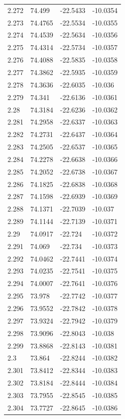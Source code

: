 \begin{tabular}{llll}
2.272 & 74.499 & -22.5433 & -10.0354 \\
2.273 & 74.4765 & -22.5534 & -10.0355 \\
2.274 & 74.4539 & -22.5634 & -10.0356 \\
2.275 & 74.4314 & -22.5734 & -10.0357 \\
2.276 & 74.4088 & -22.5835 & -10.0358 \\
2.277 & 74.3862 & -22.5935 & -10.0359 \\
2.278 & 74.3636 & -22.6035 & -10.036 \\
2.279 & 74.341 & -22.6136 & -10.0361 \\
2.28 & 74.3184 & -22.6236 & -10.0362 \\
2.281 & 74.2958 & -22.6337 & -10.0363 \\
2.282 & 74.2731 & -22.6437 & -10.0364 \\
2.283 & 74.2505 & -22.6537 & -10.0365 \\
2.284 & 74.2278 & -22.6638 & -10.0366 \\
2.285 & 74.2052 & -22.6738 & -10.0367 \\
2.286 & 74.1825 & -22.6838 & -10.0368 \\
2.287 & 74.1598 & -22.6939 & -10.0369 \\
2.288 & 74.1371 & -22.7039 & -10.037 \\
2.289 & 74.1144 & -22.7139 & -10.0371 \\
2.29 & 74.0917 & -22.724 & -10.0372 \\
2.291 & 74.069 & -22.734 & -10.0373 \\
2.292 & 74.0462 & -22.7441 & -10.0374 \\
2.293 & 74.0235 & -22.7541 & -10.0375 \\
2.294 & 74.0007 & -22.7641 & -10.0376 \\
2.295 & 73.978 & -22.7742 & -10.0377 \\
2.296 & 73.9552 & -22.7842 & -10.0378 \\
2.297 & 73.9324 & -22.7942 & -10.0379 \\
2.298 & 73.9096 & -22.8043 & -10.038 \\
2.299 & 73.8868 & -22.8143 & -10.0381 \\
2.3 & 73.864 & -22.8244 & -10.0382 \\
2.301 & 73.8412 & -22.8344 & -10.0383 \\
2.302 & 73.8184 & -22.8444 & -10.0384 \\
2.303 & 73.7955 & -22.8545 & -10.0385 \\
2.304 & 73.7727 & -22.8645 & -10.0386 \\

\end{tabular}
